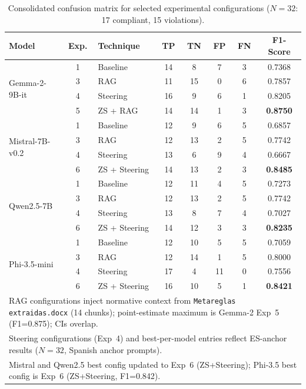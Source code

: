 \documentclass{ieeeaccess}
\begin{document}
\begin{table}[htbp]
\centering
\caption{Consolidated confusion matrix for selected experimental configurations ($N=32$: 17 compliant, 15 violations).}
\label{tab:confusion_matrix}
\renewcommand{\arraystretch}{1.2}
\begin{tabular}{|l|c|l|c|c|c|c|c|}
\hline
\textbf{Model} & \textbf{Exp.} & \textbf{Technique} & \textbf{TP} & \textbf{TN} & \textbf{FP} & \textbf{FN} & \textbf{F1-Score} \\
\hline

\multirow{4}{*}{Gemma-2-9B-it}
& 1 & Baseline            & 14 &  8 & 7  & 3  & 0.7368 \\
& 3 & RAG                 & 11 & 15 & 0  & 6  & 0.7857 \\
& 4 & Steering            & 16 &  9 & 6  & 1  & 0.8205 \\
& 5 & ZS + RAG            & 14 & 14 & 1  & 3  & \textbf{0.8750} \\
\hline

\multirow{4}{*}{Mistral-7B-v0.2}
& 1 & Baseline            & 12 &  9 & 6  & 5  & 0.6857 \\
& 3 & RAG                 & 12 & 13 & 2  & 5  & 0.7742 \\
& 4 & Steering            & 13 &  6 & 9  & 4  & 0.6667 \\
& 6 & ZS + Steering       & 14 & 13 & 2  & 3  & \textbf{0.8485} \\
\hline

\multirow{4}{*}{Qwen2.5-7B}
& 1 & Baseline            & 12 & 11 & 4  & 5  & 0.7273 \\
& 3 & RAG                 & 12 & 13 & 2  & 5  & 0.7742 \\
& 4 & Steering            & 13 &  8 & 7  & 4  & 0.7027 \\
& 6 & ZS + Steering       & 14 & 12 & 3  & 3  & \textbf{0.8235} \\
\hline

\multirow{4}{*}{Phi-3.5-mini}
& 1 & Baseline            & 12 & 10 & 5  & 5  & 0.7059 \\
& 3 & RAG                 & 12 & 14 & 1  & 5  & 0.8000 \\
& 4 & Steering            & 17 &  4 & 11 & 0  & 0.7556 \\
& 6 & ZS + Steering       & 16 & 10 & 5  & 1  & \textbf{0.8421} \\
\hline
\multicolumn{8}{l}{\footnotesize RAG configurations inject normative context from \texttt{Metareglas extraidas.docx} (14 chunks); point-estimate maximum is Gemma-2 Exp~5 (F1=0.875); CIs overlap.} \\
\multicolumn{8}{l}{\footnotesize Steering configurations (Exp~4) and best-per-model entries reflect ES-anchor results ($N=32$, Spanish anchor prompts).} \\
\multicolumn{8}{l}{\footnotesize Mistral and Qwen2.5 best config updated to Exp~6 (ZS+Steering); Phi-3.5 best config is Exp~6 (ZS+Steering, F1=0.842).} \\
\end{tabular}
\end{table}
\end{document}
